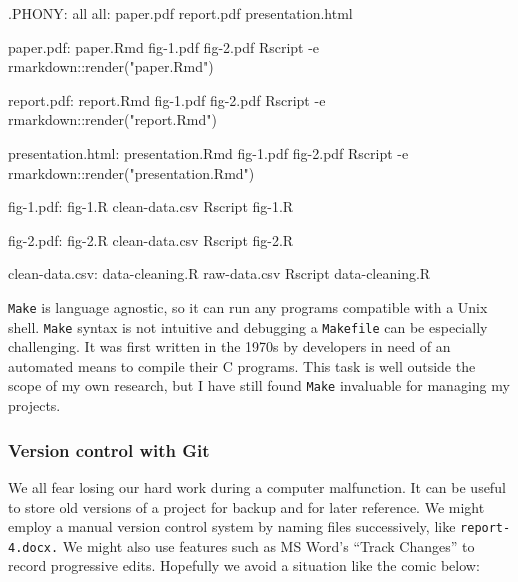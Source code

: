 \documentclass[
  letterpaper,
  openany]{book}
\newenvironment{Shaded}{\begin{snugshade}}{\end{snugshade}}
\newcommand{\DataTypeTok}[1]{\textcolor[rgb]{0.13,0.29,0.53}{#1}}
\newcommand{\DecValTok}[1]{\textcolor[rgb]{0.00,0.00,0.81}{#1}}
\newcommand{\NormalTok}[1]{#1}
\newcommand{\OtherTok}[1]{\textcolor[rgb]{0.56,0.35,0.01}{#1}}
\newcommand{\StringTok}[1]{\textcolor[rgb]{0.31,0.60,0.02}{#1}}
\begin{document}
\begin{Shaded}
\begin{Highlighting}[]
\OtherTok{.PHONY:}\DataTypeTok{ all}
\DecValTok{all:}\DataTypeTok{ paper.pdf report.pdf presentation.html}

\DecValTok{paper.pdf:}\DataTypeTok{ paper.Rmd fig{-}1.pdf fig{-}2.pdf }
\NormalTok{    Rscript {-}e }\StringTok{\textquotesingle{}rmarkdown::render("paper.Rmd")\textquotesingle{}}

\DecValTok{report.pdf:}\DataTypeTok{ report.Rmd fig{-}1.pdf fig{-}2.pdf}
\NormalTok{    Rscript {-}e }\StringTok{\textquotesingle{}rmarkdown::render("report.Rmd")\textquotesingle{}}

\DecValTok{presentation.html:}\DataTypeTok{ presentation.Rmd fig{-}1.pdf fig{-}2.pdf }
\NormalTok{    Rscript {-}e }\StringTok{\textquotesingle{}rmarkdown::render("presentation.Rmd")\textquotesingle{}}

\DecValTok{fig{-}1.pdf:}\DataTypeTok{ fig{-}1.R clean{-}data.csv}
\NormalTok{    Rscript fig{-}1.R}

\DecValTok{fig{-}2.pdf:}\DataTypeTok{ fig{-}2.R clean{-}data.csv}
\NormalTok{    Rscript fig{-}2.R}

\DecValTok{clean{-}data.csv:}\DataTypeTok{ data{-}cleaning.R raw{-}data.csv}
\NormalTok{    Rscript data{-}cleaning.R}
\end{Highlighting}
\end{Shaded}

\texttt{Make} is language agnostic, so it can run any programs compatible with a Unix shell.
\texttt{Make} syntax is not intuitive and debugging a \texttt{Makefile} can be especially challenging.
It was first written in the 1970s by developers in need of an automated means to compile their C programs.
This task is well outside the scope of my own research, but I have still found \texttt{Make} invaluable for managing my projects.

\hypertarget{version-control}{%
\subsubsection{Version control with Git}\label{version-control}}

We all fear losing our hard work during a computer malfunction.
It can be useful to store old versions of a project for backup and for later reference.
We might employ a manual version control system by naming files successively, like \texttt{report-4.docx.}
We might also use features such as MS Word's ``Track Changes'' to record progressive edits.
Hopefully we avoid a situation like the comic below:
\end{document}
